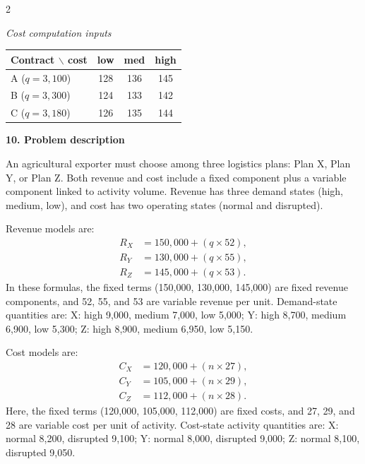 \documentclass[12pt]{article}
\newcommand{\SubsectionBox}[1]{%
	\noindent\colorbox{gray!30}{%
		\parbox{\linewidth}{\textbf{#1}}%
	}\par\vspace{0.35cm}%
}
\begin{document}
\begin{multicols}{2}
\begin{center}
					\vspace{0.5cm}
					
					\textit{Cost computation inputs}
					\begin{center}
						\begin{tabular}{l c c c}
							\toprule
							Contract $\backslash$ cost & low & med & high \\
							\midrule
							A ($q=3{,}100$) & 128 & 136 & 145 \\
							B ($q=3{,}300$) & 124 & 133 & 142 \\
							C ($q=3{,}180$) & 126 & 135 & 144 \\
							\bottomrule
						\end{tabular}
					\end{center}
				\end{center}
				
		\vspace{0.25cm}
		\SubsectionBox{10. Problem description}\vspace{-0.25cm}
		An agricultural exporter must choose among three logistics plans: Plan X, Plan Y, or Plan Z.
				Both revenue and cost include a fixed component plus a variable component linked to activity volume.
				Revenue has three demand states (high, medium, low), and cost has two operating states (normal and disrupted).
				
				Revenue models are:
				\[
				\begin{aligned}
				R_X &= 150{,}000 + (q\times52),\\
				R_Y &= 130{,}000 + (q\times55),\\
				R_Z &= 145{,}000 + (q\times53).
				\end{aligned}
				\]
				In these formulas, the fixed terms (150{,}000, 130{,}000, 145{,}000) are fixed revenue components, and 52, 55, and 53 are variable revenue per unit.
				Demand-state quantities are:
				X: high 9{,}000, medium 7{,}000, low 5{,}000;
				Y: high 8{,}700, medium 6{,}900, low 5{,}300;
				Z: high 8{,}900, medium 6{,}950, low 5{,}150.
				
				Cost models are:
				\[
				\begin{aligned}
				C_X &= 120{,}000 + (n\times27),\\
				C_Y &= 105{,}000 + (n\times29),\\
				C_Z &= 112{,}000 + (n\times28).
				\end{aligned}
				\]
				Here, the fixed terms (120{,}000, 105{,}000, 112{,}000) are fixed costs, and 27, 29, and 28 are variable cost per unit of activity.
				Cost-state activity quantities are:
				X: normal 8{,}200, disrupted 9{,}100;
				Y: normal 8{,}000, disrupted 9{,}000;
				Z: normal 8{,}100, disrupted 9{,}050.
				

\end{multicols}
\end{document}
